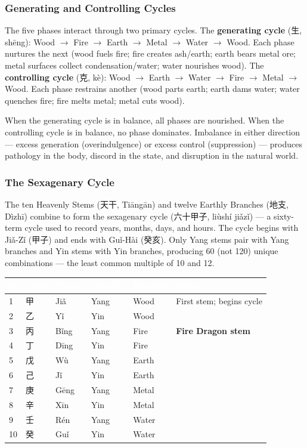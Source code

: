 \documentclass[11pt,letterpaper]{article}
\newcommand{\tableheader}[1]{\textbf{\sffamily\textcolor{white}{#1}}}
\begin{document}
\subsubsection{Generating and Controlling Cycles}

The five phases interact through two primary cycles. The \textbf{generating cycle} (生, shēng): Wood $\rightarrow$ Fire $\rightarrow$ Earth $\rightarrow$ Metal $\rightarrow$ Water $\rightarrow$ Wood. Each phase nurtures the next (wood fuels fire; fire creates ash/earth; earth bears metal ore; metal surfaces collect condensation/water; water nourishes wood). The \textbf{controlling cycle} (克, kè): Wood $\rightarrow$ Earth $\rightarrow$ Water $\rightarrow$ Fire $\rightarrow$ Metal $\rightarrow$ Wood. Each phase restrains another (wood parts earth; earth dams water; water quenches fire; fire melts metal; metal cuts wood).

When the generating cycle is in balance, all phases are nourished. When the controlling cycle is in balance, no phase dominates. Imbalance in either direction --- excess generation (overindulgence) or excess control (suppression) --- produces pathology in the body, discord in the state, and disruption in the natural world.

\subsubsection{The Sexagenary Cycle}

The ten Heavenly Stems (天干, Tiāngān) and twelve Earthly Branches (地支, Dìzhī) combine to form the sexagenary cycle (六十甲子, liùshí jiǎzǐ) --- a sixty-term cycle used to record years, months, days, and hours. The cycle begins with Jiǎ-Zǐ (甲子) and ends with Guǐ-Hài (癸亥). Only Yang stems pair with Yang branches and Yin stems with Yin branches, producing 60 (not 120) unique combinations --- the least common multiple of 10 and 12.

\begin{center}
\begin{tabularx}{\textwidth}{C{0.8cm}L{1.2cm}L{1.5cm}L{1.5cm}L{2cm}X}
\toprule
{}
\tableheader{\#} & \tableheader{Stem} & \tableheader{Pinyin} & \tableheader{Polarity} & \tableheader{Element} & \tableheader{Notes} \\
 & 甲 & Jiǎ & Yang & Wood & First stem; begins cycle \\
2 & 乙 & Yǐ & Yin & Wood & \\
3 & 丙 & Bǐng & Yang & Fire & \textbf{Fire Dragon stem} \\
4 & 丁 & Dīng & Yin & Fire & \\
5 & 戊 & Wù & Yang & Earth & \\
6 & 己 & Jǐ & Yin & Earth & \\
7 & 庚 & Gēng & Yang & Metal & \\
8 & 辛 & Xīn & Yin & Metal & \\
9 & 壬 & Rén & Yang & Water & \\
10 & 癸 & Guǐ & Yin & Water & \\
\bottomrule
\end{tabularx}
\end{center}
\end{document}

